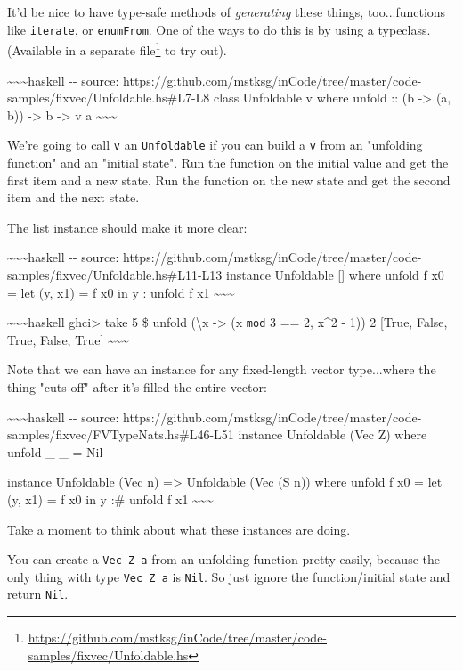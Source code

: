 \documentclass[]{article}
\renewcommand{\href}[2]{#2\footnote{\url{#1}}}
\begin{document}
It'd be nice to have type-safe methods of \emph{generating} these things,
too...functions like \texttt{iterate}, or \texttt{enumFrom}. One of the ways to
do this is by using a typeclass. (Available in a
\href{https://github.com/mstksg/inCode/tree/master/code-samples/fixvec/Unfoldable.hs}{separate
file} to try out).

\textasciitilde{}\textasciitilde{}\textasciitilde{}haskell -\/- source:
https://github.com/mstksg/inCode/tree/master/code-samples/fixvec/Unfoldable.hs\#L7-L8
class Unfoldable v where unfold :: (b -\textgreater{} (a, b)) -\textgreater{} b
-\textgreater{} v a \textasciitilde{}\textasciitilde{}\textasciitilde{}

We're going to call \texttt{v} an \texttt{Unfoldable} if you can build a
\texttt{v} from an "unfolding function" and an "initial state". Run the function
on the initial value and get the first item and a new state. Run the function on
the new state and get the second item and the next state.

The list instance should make it more clear:

\textasciitilde{}\textasciitilde{}\textasciitilde{}haskell -\/- source:
https://github.com/mstksg/inCode/tree/master/code-samples/fixvec/Unfoldable.hs\#L11-L13
instance Unfoldable {[}{]} where unfold f x0 = let (y, x1) = f x0 in y : unfold
f x1 \textasciitilde{}\textasciitilde{}\textasciitilde{}

\textasciitilde{}\textasciitilde{}\textasciitilde{}haskell ghci\textgreater{}
take 5 \$ unfold (\textbackslash{}x -\textgreater{} (x \texttt{mod} 3 == 2,
x\^{}2 - 1)) 2 {[}True, False, True, False, True{]}
\textasciitilde{}\textasciitilde{}\textasciitilde{}

Note that we can have an instance for any fixed-length vector type...where the
thing "cuts off" after it's filled the entire vector:

\textasciitilde{}\textasciitilde{}\textasciitilde{}haskell -\/- source:
https://github.com/mstksg/inCode/tree/master/code-samples/fixvec/FVTypeNats.hs\#L46-L51
instance Unfoldable (Vec Z) where unfold \_ \_ = Nil

instance Unfoldable (Vec n) =\textgreater{} Unfoldable (Vec (S n)) where unfold
f x0 = let (y, x1) = f x0 in y :\# unfold f x1
\textasciitilde{}\textasciitilde{}\textasciitilde{}

Take a moment to think about what these instances are doing.

You can create a \texttt{Vec\ Z\ a} from an unfolding function pretty easily,
because the only thing with type \texttt{Vec\ Z\ a} is \texttt{Nil}. So just
ignore the function/initial state and return \texttt{Nil}.
\end{document}
